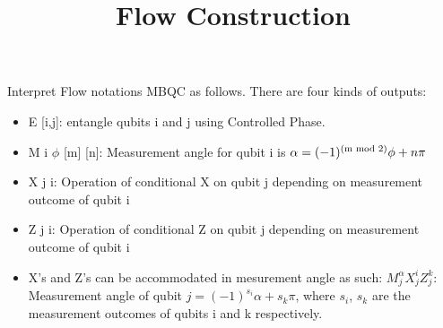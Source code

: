 \documentclass[10pts, a4paper]{article}
\title{ \begin{large}
\textbf{Flow Construction}
\end{large} 
}
\date{}
\begin{document}
\maketitle
Interpret Flow notations MBQC as follows. There are four kinds of outputs:
\begin{itemize}
\item E [i,j]: entangle qubits i and j using Controlled Phase. 
\item M i $\phi$ [m] [n]: Measurement angle for qubit i is $\alpha=(-1)^{\textnormal{(m mod 2)}}\phi+n\pi$
\item X j i: Operation of conditional X on qubit j depending on measurement outcome of qubit i
\item Z j i: Operation of conditional Z on qubit j depending on measurement outcome of qubit i
\item X's and Z's can be accommodated in mesurement angle as such: $M_j^\alpha X_j^i Z_j^k$: Measurement angle of qubit $j=(-1)^{s_i} \alpha+s_k\pi$, where $s_i$, $s_k$ are the measurement outcomes of qubits i and k respectively.
\end{itemize}
\end{document}
